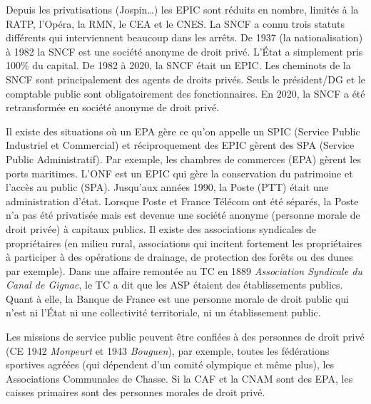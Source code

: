 \documentclass[math]{cours}
\begin{document}
Depuis les privatisations (Jospin\ldots) les EPIC sont réduits en nombre, limités à la RATP, l'Opéra, la RMN, le CEA et le CNES.
La SNCF a connu trois statuts différents qui interviennent beaucoup dans les arrêts.
De 1937 (la nationalisation) à 1982 la SNCF est une société anonyme de droit privé. L'État a simplement pris 100\% du capital.
De 1982 à 2020, la SNCF était un EPIC. Les cheminots de la SNCF sont principalement des agents de droits privés.
Seuls le président/DG et le comptable public sont obligatoirement des fonctionnaires.
En 2020, la SNCF a été retransformée en société anonyme de droit privé.

Il existe des situations où un EPA gère ce qu'on appelle un SPIC (Service Public Industriel et Commercial) et réciproquement des EPIC gèrent des SPA (Service Public Administratif).
Par exemple, les chambres de commerces (EPA) gèrent les ports maritimes. L'ONF est un EPIC qui gère la conservation du patrimoine et l'accès au public (SPA).
Jusqu'aux années 1990, la Poste (PTT) était une administration d'état. Lorsque Poste et France Télécom ont été séparés, la Poste n'a pas été privatisée mais est devenue une société anonyme (personne morale de droit privée) à capitaux publics.
Il existe des associations syndicales de propriétaires (en milieu rural, associations qui incitent fortement les propriétaires à participer à des opérations de drainage, de protection des forêts ou des dunes par exemple).
Dans une affaire remontée au TC en 1889 \emph{Association Syndicale du Canal de Gignac}, le TC a dit que les ASP étaient des établissements publics.
Quant à elle, la Banque de France est une personne morale de droit public qui n'est ni l'État ni une collectivité territoriale, ni un établissement public.

Les missions de service public peuvent être confiées à des personnes de droit privé (CE 1942 \emph{Monpeurt} et 1943 \emph{Bouguen}),
par exemple, toutes les fédérations sportives agréées (qui dépendent d'un comité olympique et même plus), les Associations Communales de Chasse.
Si la CAF et la CNAM sont des EPA, les caisses primaires sont des personnes morales de droit privé.
\end{document}
